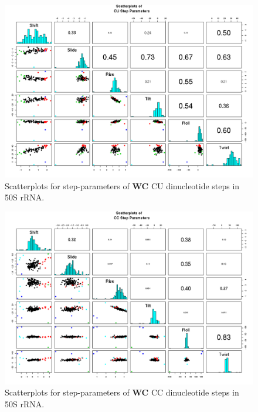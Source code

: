 \begin{figure}[H]
\centering
\includegraphics[angle=90, scale=0.6]{WC/CU.png}
\caption{Scatterplots for step-parameters of \textbf{WC} CU dinucleotide steps
in 50S rRNA.}
\label{fig:stepsCU}
\end{figure}

\begin{figure}[H]
\centering
\includegraphics[angle=90, scale=0.6]{WC/CC.png}
\caption{Scatterplots for step-parameters of \textbf{WC} CC dinucleotide steps
in 50S rRNA.}
\label{fig:stepsCC}
\end{figure}

